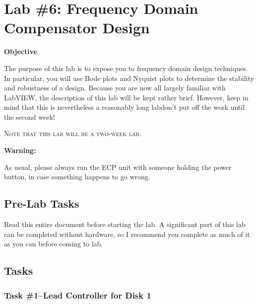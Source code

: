 \fancyhf{}
\fancyfoot[C]{\vspace{.2in}\thepage}

\chapter{Lab \#6: Frequency Domain Compensator Design}

\begin{center}  \textbf{Objective}
\end{center}

The purpose of this lab is to expose you to frequency domain design techniques.
In particular, you will use Bode plots and Nyquist plots to determine the
stability and robustness of a design.  Because you are now all largely familiar
with LabVIEW, the description of this lab will be kept rather brief.  However,
keep in mind that this is nevertheless a reasonably long lab\textendash don't put off the
work until the second week!




\vspace{.2in}

\begin{center} \textsc{Note that this lab will be a two-week lab.}
\end{center}

\begin{center} \textbf{Warning:} 
\end{center}

As usual, please always run the ECP unit with someone holding the power button,
in case something happens to go wrong.

\newpage
\section{Pre-Lab Tasks}

Read this entire document before starting the lab.  A significant part of this
lab can be completed without hardware, so I recommend you complete as much of it
as you can before coming to lab.
\section{Tasks}






\subsection{Task \#1--Lead Controller for Disk 1}

